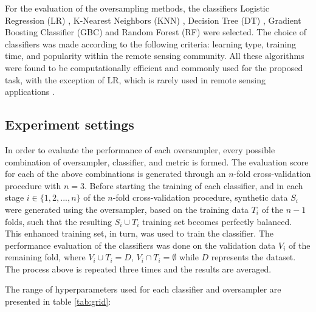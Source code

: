 \documentclass[remotesensing,article,submit,moreauthors,pdftex]{Definitions/mdpi}
\begin{document}
For the evaluation of the oversampling methods, the classifiers Logistic
Regression (LR) \cite{McCullagh1989}, K-Nearest Neighbors (KNN)
\cite{Cover1967}, Decision Tree (DT) \cite{Salzberg1994}, Gradient Boosting
Classifier (GBC) \cite{Friedman2001} and Random Forest (RF) \cite{Liaw2002} were
selected. The choice of classifiers was made according to the following
criteria: learning type, training time, and popularity within the remote sensing
community. All these algorithms were found to be computationally efficient and
commonly used for the proposed task, with the exception of LR, which is rarely
used in remote sensing applications \cite{Khatami2016, Maxwell2018}.

\subsection{Experiment settings}

In order to evaluate the performance of each oversampler, every possible
combination of oversampler, classifier, and metric is formed. The evaluation
score for each of the above combinations is generated through an \( n \)-fold
cross-validation procedure with \( n = 3 \). Before starting the training of
each classifier, and in each stage \(i \in \{1, 2 ,... , n \} \) of the \( n
\)-fold cross-validation procedure, synthetic data \( S_{i} \) were generated
using the oversampler, based on the training data \(T_{i} \) of the \( n - 1 \)
folds, such that the resulting \(S_{i} \cup T_{i} \) training set becomes
perfectly balanced. This enhanced training set, in turn, was used to train the
classifier. The performance evaluation of the classifiers was done on the
validation data \( V_{i} \) of the remaining fold, where \(V_{i} \cup T_{i} = D
\), \(V_{i} \cap T_{i} = \emptyset \) while \( D \) represents the dataset. The
process above is repeated three times and the results are averaged.

The range of hyperparameters used for each classifier and oversampler are
presented in table \ref{tab:grid}:
\end{document}
